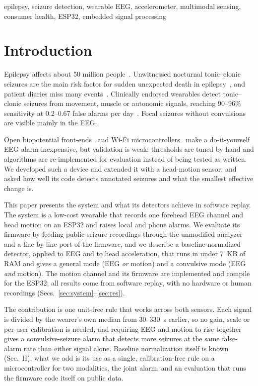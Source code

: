 \documentclass[conference,letterpaper]{IEEEtran}
\begin{document}
\begin{IEEEkeywords}
epilepsy, seizure detection, wearable EEG, accelerometer, multimodal sensing, consumer health, ESP32, embedded signal processing
\end{IEEEkeywords}

\section{Introduction}
Epilepsy affects about 50 million people~\cite{who2024epilepsy}. Unwitnessed nocturnal tonic--clonic seizures are the main risk factor for sudden unexpected death in epilepsy~\cite{devinsky2016sudep}, and patient diaries miss many events~\cite{elger2018underreporting}. Clinically endorsed wearables detect tonic--clonic seizures from movement, muscle or autonomic signals, reaching 90--96\% sensitivity at 0.2--0.67 false alarms per day~\cite{beniczky2021guideline,beniczky2013acc,onorati2017embrace}. Focal seizures without convulsions are visible mainly in the EEG.

Open biopotential front-ends~\cite{bioamp} and Wi-Fi microcontrollers~\cite{esp32} make a do-it-yourself EEG alarm inexpensive, but validation is weak: thresholds are tuned by hand and algorithms are re-implemented for evaluation instead of being tested as written. We developed such a device and extended it with a head-motion sensor, and asked how well its code detects annotated seizures and what the smallest effective change is.

This paper presents the system and what its detectors achieve in software replay. The system is a low-cost wearable that records one forehead EEG channel and head motion on an ESP32 and raises local and phone alarms. We evaluate its firmware by feeding public seizure recordings through the unmodified analyzer and a line-by-line port of the firmware, and we describe a baseline-normalized detector, applied to EEG and to head acceleration, that runs in under 7~KB of RAM and gives a general mode (EEG \emph{or} motion) and a convulsive mode (EEG \emph{and} motion). The motion channel and its firmware are implemented and compile for the ESP32; all results come from software replay, with no hardware or human recordings (Secs.~\ref{sec:system}--\ref{sec:res}).

The contribution is one unit-free rule that works across both sensors. Each signal is divided by the wearer's own median from 30--330~s earlier, so no gain, scale or per-user calibration is needed, and requiring EEG and motion to rise together gives a convulsive-seizure alarm that detects more seizures at the same false-alarm rate than either signal alone. Baseline normalization itself is known (Sec.~II); what we add is its use as a single, calibration-free rule on a microcontroller for two modalities, the joint alarm, and an evaluation that runs the firmware code itself on public data.
\end{document}
